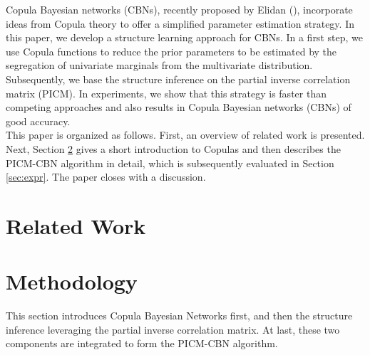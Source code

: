 \documentclass{article}
\begin{document}
Copula Bayesian networks (CBNs), recently proposed by Elidan (\citeyear{ElidanCopula}), incorporate ideas from Copula theory to offer a simplified parameter estimation strategy. In this paper, we develop a structure learning approach for CBNs. In a first step, we use Copula functions to reduce the prior parameters to be estimated by the segregation of univariate marginals from the multivariate distribution. Subsequently, we base the structure inference on the partial inverse correlation matrix (PICM). In experiments, we show that this strategy is faster than competing approaches and also results in Copula Bayesian networks (CBNs) of good accuracy.\\
This paper is organized as follows. First, an overview of related work is presented. Next, Section \ref{sec:method} gives a short introduction to Copulas and then describes the PICM-CBN algorithm in detail, which is subsequently evaluated in Section \ref{sec:expr}. The paper closes with a discussion.

\section{Related Work} 
\label{sec:soa}



\section{Methodology} 
\label{sec:method}
This section introduces Copula Bayesian Networks first, and then the structure inference 
leveraging the partial inverse correlation matrix. %
At last, these two components are integrated to form the PICM-CBN algorithm.
\end{document}

